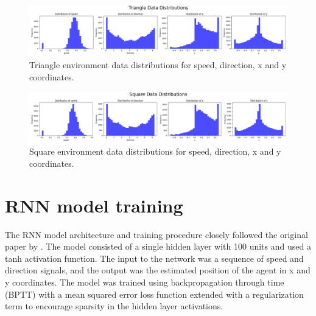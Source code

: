 \documentclass{article}
\begin{document}
\begin{figure}
    \centering
    \includegraphics[width=\textwidth]{figures/triangle_data_distribution.png}
    \caption{Triangle environment data distributions for speed, direction, x and y coordinates.}
    \label{fig:triangle_data_distribution}
\end{figure}

\begin{figure}
    \centering
    \includegraphics[width=\textwidth]{figures/square_data_distribution.png}
    \caption{Square environment data distributions for speed, direction, x and y coordinates.}
    \label{fig:square_data_distribution}
\end{figure}


\section{RNN model training}
The RNN model architecture and training procedure closely followed the original paper by \cite{chaplot2018active}. The model consisted of a single hidden layer with 100 units and used a tanh activation function. The input to the network was a sequence of speed and direction signals, and the output was the estimated position of the agent in x and y coordinates. The model was trained using backpropagation through time (BPTT) with a mean squared error loss function extended with a regularization term to encourage sparsity in the hidden layer activations.
\end{document}
